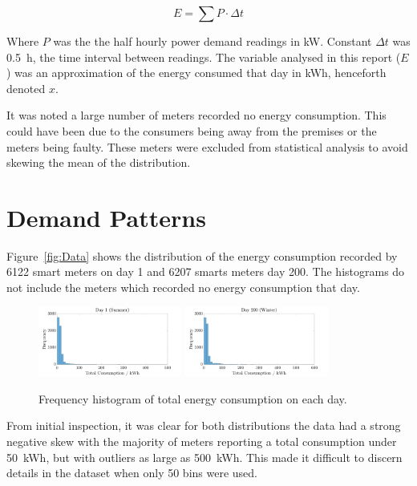 \documentclass[a4paper,10pt,twocolumn]{article}
\begin{document}
\begin{equation}
    E = \sum{P \cdot \Delta t}
    \label{eq:Integrate}
\end{equation}

Where $P$ was the the half hourly power demand readings in kW. Constant $\Delta 
t$ was 0.5~h, the time interval between readings. The variable analysed in this 
report ($E$) was an approximation of the energy consumed that day in kWh, 
henceforth denoted $x$.

It was noted a large number of meters recorded no energy consumption. This 
could have been due to the consumers being away from the premises or the meters 
being faulty. These meters were excluded from statistical analysis to avoid 
skewing the mean of the distribution.

\section{Demand Patterns}

Figure~\vref{fig:Data} shows the distribution of the energy consumption 
recorded by 6122 smart meters on day 1 and 6207 smarts meters day 200. The 
histograms do not include the meters which recorded no energy consumption that 
day.
    
\begin{figure}[h]
    \centering
    \includegraphics[width=0.42\textwidth]{Day1}
    \includegraphics[width=0.42\textwidth]{Day200}
    \caption{Frequency histogram of total energy consumption on each day.}
    \label{fig:Data}
\end{figure}

From initial inspection, it was clear for both distributions the data had a 
strong negative skew with the majority of meters reporting a total consumption 
under 50~kWh, but with outliers as large as 500~kWh. This made it difficult to 
discern details in the dataset when only 50 bins were used.
\end{document}
